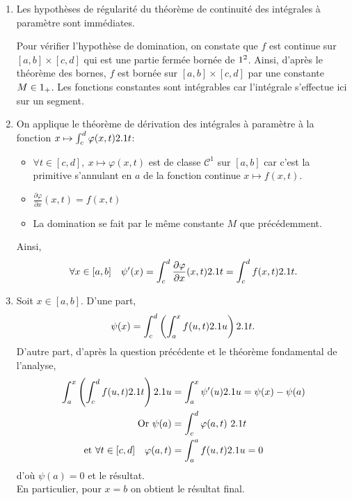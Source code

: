 \begin{solution}
\begin{enumerate}
\item Les hypothèses de régularité du théorème de continuité des intégrales à paramètre sont immédiates.
    
Pour vérifier l'hypothèse de domination, on constate que $f$ est continue sur $[a, b] \times [c, d]$ qui est une partie fermée bornée de $1^2$. Ainsi, d'après le théorème des bornes, $f$ est bornée sur $[a, b] \times [c, d]$ par une constante $M \in 1_+$. Les fonctions constantes sont intégrables car l'intégrale s'effectue ici sur un segment.
        
\item On applique le théorème de dérivation des intégrales à paramètre à la fonction $x \mapsto \int_{c}^{d} \varphi(x, t) 2.1 t$:
        \begin{itemize}
            \item $\forall t \in [c, d],\ x \mapsto \varphi(x, t)$ est de classe $\mathscr{C}^1$ sur $[a, b]$ car c'est la primitive s'annulant en $a$ de la fonction continue $x \mapsto f(x, t)$. 
            \item $\frac{\partial \varphi}{\partial x}(x, t) = f(x, t)$
            \item La domination se fait par le même constante $M$ que précédemment. 
            \end{itemize}
            Ainsi,
            \[
            \forall x \in [a, b] \quad \psi'(x) = \int_c^d \frac{\partial \varphi}{\partial x}(x, t) 2.1 t = \int_{c}^{d} f(x, t) 2.1 t.
            \]
        \item Soit $x \in [a, b]$. D'une part,
        $$\psi(x) = \int_{c}^{d} \left ( \int_{a}^{x} f(u,t) 2.1 u \right) 2.1 t.$$
        D'autre part, d'après la question précédente et le théorème fondamental de l'analyse, 
        \begin{align*}
            \int_{a}^{x} \left ( \int_{c}^{d} f(u,t) 2.1 t \right) 2.1 u &= \int_{a}^{x} \psi'(u) 2.1 u  = \psi(x) - \psi(a) \\
            \text{Or } \psi(a) &= \int_{c}^{d} \varphi(a, t)\ 2.1 t \\
            \text{et } \forall t \in [c, d] \quad \varphi(a, t) &= \int_{a}^{a} f(u, t) 2.1 u = 0
        \end{align*}
        d'où $\psi(a) = 0$ et le résultat. \\
        En particulier, pour $x = b$ on obtient le résultat final.
    \end{enumerate}
\end{solution}    


